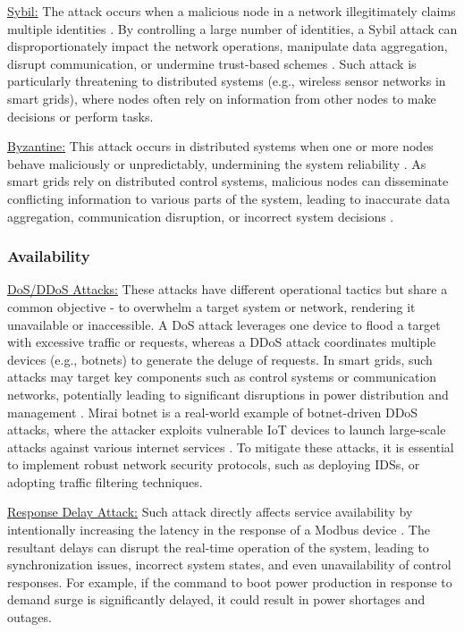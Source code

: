 \documentclass[10pt, journal]{IEEEtran}
\begin{document}
\underline{Sybil:} The attack occurs when a malicious node in a network illegitimately claims multiple identities \cite{levine2006survey,newsome2004sybil}. By controlling a large number of identities, a Sybil attack can disproportionately impact the network operations, manipulate data aggregation, disrupt communication, or undermine trust-based schemes \cite{sarigiannidis2015detecting}. Such attack is particularly threatening to distributed systems (e.g., wireless sensor networks in smart grids), where nodes often rely on information from other nodes to make decisions or perform tasks. 
			
\underline{Byzantine:} This attack occurs in distributed systems when one or more nodes behave maliciously or unpredictably, undermining the system reliability \cite{ross2013using}. As smart grids rely on distributed control systems, malicious nodes can disseminate conflicting information to various parts of the system, leading to inaccurate data aggregation, communication disruption, or incorrect system decisions \cite{lamport2019byzantine}.

\subsubsection{Availability}

\underline{DoS/DDoS Attacks:} These attacks have different operational tactics but share a common objective - to overwhelm a target system or network, rendering it unavailable or inaccessible. A DoS attack leverages one device to flood a target with excessive traffic or requests, whereas a DDoS attack coordinates multiple devices (e.g., botnets) to generate the deluge of requests. In smart grids, such attacks may target key components such as control systems or communication networks, potentially leading to significant disruptions in power distribution and management \cite{huseinovic2020survey}. Mirai botnet is a real-world example of botnet-driven DDoS attacks, where the attacker exploits vulnerable IoT devices to launch large-scale attacks against various internet services \cite{antonakakis2017understanding}. To mitigate these attacks, it is essential to implement robust network security protocols, such as deploying IDSs, or adopting traffic filtering techniques.

\underline{Response Delay Attack:} Such attack directly affects service availability by intentionally increasing the latency in the response of a Modbus device \cite{radoglou2020implementation}. The resultant delays can disrupt the real-time operation of the system, leading to synchronization issues, incorrect system states, and even unavailability of control responses. For example, if the command to boot power production in response to demand surge is significantly delayed, it could result in power shortages and outages.
\end{document}
